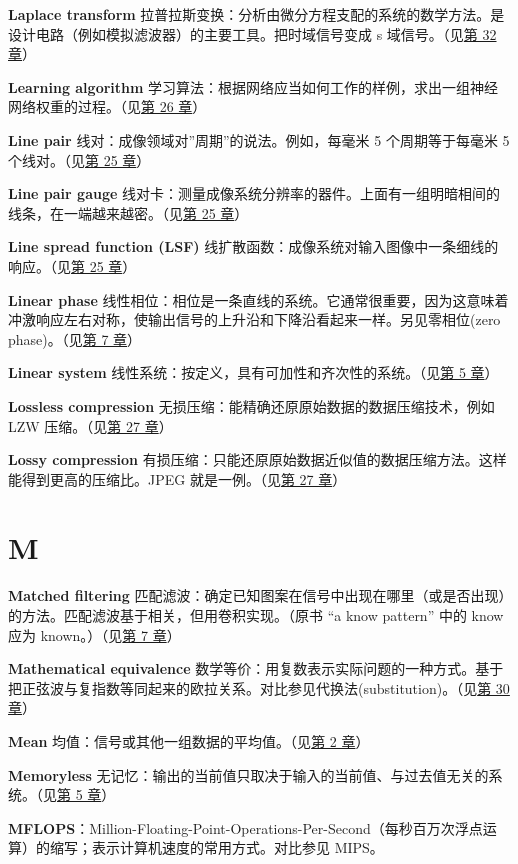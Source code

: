 \textbf{Laplace transform}
拉普拉斯变换：分析由微分方程支配的系统的数学方法。是设计电路（例如模拟滤波器）的主要工具。把时域信号变成
s 域信号。（见\hyperref[ch-32]{第 32 章}）

\textbf{Learning algorithm}
学习算法：根据网络应当如何工作的样例，求出一组神经网络权重的过程。（见\hyperref[ch-26]{第
26 章}）

\textbf{Line pair} 线对：成像领域对''周期''的说法。例如，每毫米 5
个周期等于每毫米 5 个线对。（见\hyperref[ch-25]{第 25 章}）

\textbf{Line pair gauge}
线对卡：测量成像系统分辨率的器件。上面有一组明暗相间的线条，在一端越来越密。（见\hyperref[ch-25]{第
25 章}）

\textbf{Line spread function (LSF)}
线扩散函数：成像系统对输入图像中一条细线的响应。（见\hyperref[ch-25]{第
25 章}）

\textbf{Linear phase}
线性相位：相位是一条直线的系统。它通常很重要，因为这意味着冲激响应左右对称，使输出信号的上升沿和下降沿看起来一样。另见零相位(zero
phase)。（见\hyperref[ch-07]{第 7 章}）

\textbf{Linear system}
线性系统：按定义，具有可加性和齐次性的系统。（见\hyperref[ch-05]{第 5
章}）

\textbf{Lossless compression}
无损压缩：能精确还原原始数据的数据压缩技术，例如 LZW
压缩。（见\hyperref[ch-27]{第 27 章}）

\textbf{Lossy compression}
有损压缩：只能还原原始数据近似值的数据压缩方法。这样能得到更高的压缩比。JPEG
就是一例。（见\hyperref[ch-27]{第 27 章}）

\section{M}

\textbf{Matched filtering}
匹配滤波：确定已知图案在信号中出现在哪里（或是否出现）的方法。匹配滤波基于相关，但用卷积实现。（原书
``a know pattern'' 中的 know 应为 known。）（见\hyperref[ch-07]{第 7
章}）

\textbf{Mathematical equivalence}
数学等价：用复数表示实际问题的一种方式。基于把正弦波与复指数等同起来的欧拉关系。对比参见代换法(substitution)。（见\hyperref[ch-30]{第
30 章}）

\textbf{Mean} 均值：信号或其他一组数据的平均值。（见\hyperref[ch-02]{第
2 章}）

\textbf{Memoryless}
无记忆：输出的当前值只取决于输入的当前值、与过去值无关的系统。（见\hyperref[ch-05]{第
5 章}）

\textbf{MFLOPS}：Million-Floating-Point-Operations-Per-Second（每秒百万次浮点运算）的缩写；表示计算机速度的常用方式。对比参见
MIPS。

